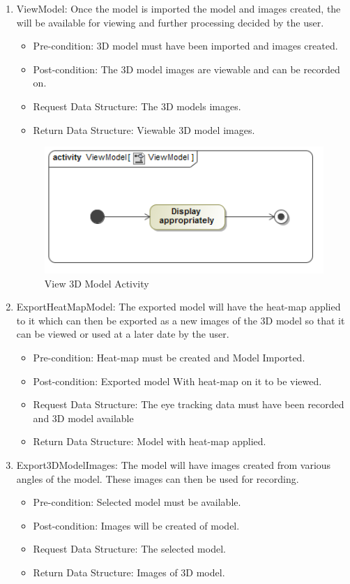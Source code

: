 \begin{enumerate}
		\item{ViewModel:}
		Once the model is imported the model and images created, the will be available for viewing and further processing decided by the user.
		\begin{itemize}
			\item Pre-condition: 3D model must have been imported and images created.
			\item Post-condition: The 3D model images are viewable and can be recorded on.
			\item Request Data Structure: The 3D models images.
			\item Return Data Structure: Viewable 3D model images.
		\end{itemize}
		\begin{figure}[!ht]
			\centering
			\includegraphics[scale=0.5,width=15cm,keepaspectratio]{Diagrams/Activity_Diagram__ViewModel__ViewModel.png}
		\caption{View 3D Model Activity}
		\end{figure}
		
		\item{ExportHeatMapModel:}
		The exported model will have the heat-map applied to it which can then be exported as a new images of the 3D model so that it can be viewed or used at a later date by the user. 
		\begin{itemize}
			\item Pre-condition: Heat-map must be created and Model Imported.
			\item Post-condition: Exported model With heat-map on it to be viewed.
			\item Request Data Structure: The eye tracking data must have been recorded and 3D model available
			\item Return Data Structure: Model with heat-map applied.
		\end{itemize}
		
		\item{Export3DModelImages:}
		The model will have images created from various angles of the model. These images can then be used for recording.
		\begin{itemize}
			\item Pre-condition: Selected model must be available.
			\item Post-condition: Images will be created of model.
			\item Request Data Structure: The selected model.
			\item Return Data Structure: Images of 3D model.
		\end{itemize}
		

\end{enumerate}

